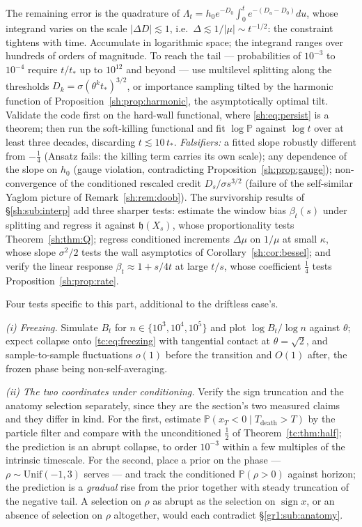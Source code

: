 \documentclass[11pt]{article}
\numberwithin{equation}{section}
\theoremstyle{plain}
\theoremstyle{definition}
\theoremstyle{remark}
\newcommand{\PP}{\mathbb{P}}
\newcommand{\hm}{\mathfrak{h}}
\begin{document}
The remaining error is the quadrature of
$\Lambda_t=h_0e^{-D_0}\int_0^te^{-(D_u-D_0)}du$, whose integrand varies on
the scale $|\Delta D|\lesssim1$, i.e.\ $\Delta\lesssim1/|\mu|\sim
t^{-1/2}$: the constraint tightens with time. Accumulate in logarithmic
space; the integrand ranges over hundreds of orders of magnitude. To reach
the tail --- probabilities of $10^{-3}$ to $10^{-4}$ require
$t/t_*$ up to $10^{12}$ and beyond --- use multilevel splitting along the
thresholds $D_k=\sigma(\theta^kt_*)^{3/2}$, or importance sampling tilted
by the harmonic function of Proposition~\ref{sh:prop:harmonic}, the
asymptotically optimal tilt. Validate the code first on the hard-wall
functional, where \eqref{sh:eq:persist} is a theorem; then run the
soft-killing functional and fit $\log\PP$ against $\log t$ over at least
three decades, discarding $t\lesssim10\,t_*$.
\emph{Falsifiers:} a fitted slope robustly different from $-\tfrac14$
(Ansatz fails: the killing term carries its own scale); any dependence of
the slope on $h_0$ (gauge violation, contradicting
Proposition~\ref{sh:prop:gauge}); non-convergence of the conditioned
rescaled credit $D_s/\sigma s^{3/2}$ (failure of the self-similar Yaglom
picture of Remark~\ref{sh:rem:doob}). The survivorship results of
\S\ref{sh:sub:interp} add three sharper tests: estimate the window bias
$\beta_t(s)$ under splitting and regress it against $\hm(X_s)$, whose
proportionality tests Theorem~\ref{sh:thm:Q}; regress conditioned
increments $\Delta\mu$ on $1/\mu$ at small $\kappa$, whose slope
$\sigma^2/2$ tests the wall asymptotics of
Corollary~\ref{sh:cor:bessel}; and verify the linear response
$\beta_t\approx1+s/4t$ at large $t/s$, whose coefficient $\tfrac14$ tests
Proposition~\ref{sh:prop:rate}.

\label{tc:sub:numerics}

Four tests specific to this part, additional to the driftless case's.

\emph{(i) Freezing.} Simulate $B_t$ for $n\in\{10^{3},10^{4},10^{5}\}$
and plot $\log B_t/\log n$ against $\theta$; expect collapse onto
\eqref{tc:eq:freezing} with tangential contact at $\theta=\sqrt2$, and
sample-to-sample fluctuations $o(1)$ before the transition and $O(1)$
after, the frozen phase being non-self-averaging.

\emph{(ii) The two coordinates under conditioning.} Verify the sign
truncation and the anatomy selection separately, since they are the
section's two measured claims and they differ in kind. For the first,
estimate $\PP(x_T<0\mid T_{\text{death}}>T)$ by the particle filter and
compare with the unconditioned $\tfrac12$ of
Theorem~\ref{tc:thm:half}; the prediction is an abrupt collapse, to
order $10^{-3}$ within a few multiples of the intrinsic timescale. For
the second, place a prior on the phase --- $\rho\sim
\mathrm{Unif}(-1,3)$ serves --- and track the conditioned
$\PP(\rho>0)$ against horizon; the prediction is a \emph{gradual} rise
from the prior together with steady truncation of the negative tail. A
selection on $\rho$ as abrupt as the selection on $\operatorname{sign}
x$, or an absence of selection on $\rho$ altogether, would each
contradict \S\ref{gr1:sub:anatomy}.
\end{document}
